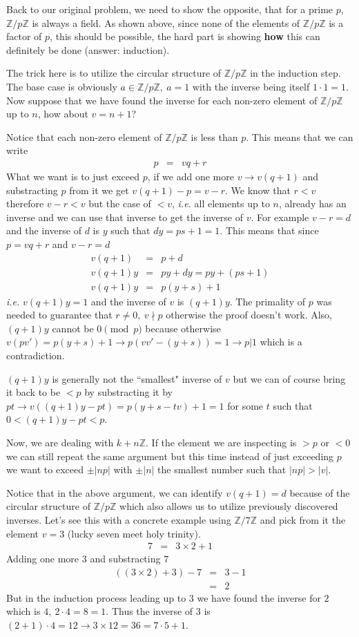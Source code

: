 \documentclass[aps,preprint,preprintnumbers,nofootinbib,showpacs,prd]{revtex4-1}
\newcommand{\ie}{{\it i.e.} }
\newcommand{\nbea}{\begin{eqnarray*}}
\newcommand{\neea}{\end{eqnarray*}}
\begin{document}
Back to our original problem, we need to show the opposite, that for a prime $p$, $\mathbb{Z}/p\mathbb{Z}$ is always a field. As shown above, since none of the elements of $\mathbb{Z}/p\mathbb{Z}$ is a factor of $p$, this should be possible, the hard part is showing {\bf how} this can definitely be done (answer: induction).

The trick here is to utilize the circular structure of $\mathbb{Z}/p\mathbb{Z}$ in the induction step. The base case is obviously $a \in \mathbb{Z}/p\mathbb{Z},~a = 1$ with the inverse being itself $1\cdot 1 = 1$. Now suppose that we have found the inverse for each non-zero element of $\mathbb{Z}/p\mathbb{Z}$ up to $n$, how about $v=n+1$?

Notice that each non-zero element of $\mathbb{Z}/p\mathbb{Z}$ is less than $p$. This means that we can write 
%
\nbea
p & = & vq + r
\neea
%
What we want is to just exceed $p$, if we add one more $v \to v(q + 1)$ and substracting $p$ from it we get $v(q + 1) - p = v - r$. We know that $r < v$ therefore $v - r < v$ but the case of $< v$, \ie all elements up to $n$, already has an inverse and we can use that inverse to get the inverse of $v$. For example $v-r = d$ and the inverse of $d$ is $y$ such that $dy=ps + 1 = 1$. This means that since $p = vq + r$ and $v-r = d$
%
\nbea
v(q+1) & = & p + d \\
v(q+1)y & = & py + dy  = py + (ps + 1)\\
v(q+1)y & = & p(y+s) + 1 
\neea
%
\ie $v(q+1)y = 1$ and the inverse of $v$ is $(q+1)y$. The primality of $p$ was needed to guarantee that $r \neq 0,~v \nmid p$ otherwise the proof doesn't work. Also, $(q+1)y$ cannot be $0\pmod{p}$ because otherwise $v(pv') = p(y+s) + 1 \to p(vv' - (y+s)) = 1\to p|1$ which is a contradiction.

$(q+1)y$ is generally not the ``smallest" inverse of $v$ but we can of course bring it back to be $< p$ by substracting it by $pt \to v((q+1)y -pt) = p(y+s-tv) + 1 = 1$ for some $t$ such that $0 < (q+1)y -pt < p$.

Now, we are dealing with $k + n\mathbb{Z}$. If the element we are inspecting is $> p$ or $< 0$ we can still repeat the same argument but this time instead of just exceeding $p$ we want to exceed $\pm|np|$ with $\pm|n|$ the smallest number such that $|np| > |v|$.

Notice that in the above argument, we can identify $v(q+1) = d$ because of the circular structure of $\mathbb{Z}/p\mathbb{Z}$ which also allows us to utilize previously discovered inverses. Let's see this with a concrete example using $\mathbb{Z}/7\mathbb{Z}$ and pick from it the element $v = 3$ (lucky seven meet holy trinity).
%
\nbea
7 & = & 3 \times 2 + 1
\neea
%
Adding one more $3$ and substracting $7$
%
\nbea
((3 \times 2) + 3) - 7 & = & 3 - 1 \\
& = & 2
\neea
%
But in the induction process leading up to $3$ we have found the inverse for $2$ which is $4, ~2\cdot 4 = 8 = 1$. Thus the inverse of $3$ is $(2+1)\cdot 4 = 12 \to 3 \times 12 = 36 = 7\cdot 5 + 1$.
\end{document}
